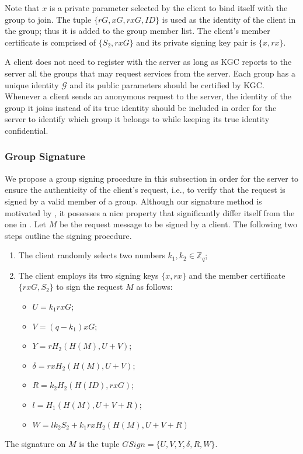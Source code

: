 \documentclass[letterpaper,12pt]{article}
\begin{document}
Note that $x$ is a private parameter selected by the client to bind itself with the group to join.
The tuple $\{rG, xG, rxG, ID\}$ is used as the identity of the client in the group; thus it is added to the group member list. The client's member certificate is comprised of $\{S_2, rxG\}$ and its private signing key pair is $\{x, rx\}$.

A client does not need to register with the server as long as KGC reports to the server all the groups that may request services from the server. Each group has a unique identity $\mathcal{G}$ and its public parameters should be certified by KGC. Whenever a client sends an anonymous request to the server, the identity of the group it joins instead of its true identity should be included in order for the server to identify which group it belongs to while keeping its true identity confidential.

\subsubsection{Group Signature}\label{sec:signprotocol}
We propose a group signing procedure in this subsection in order for the server to ensure the authenticity of the client's request, i.e., to verify that the request is signed by a valid member of a group. Although our signature method is motivated by  \cite{chen2003new}, it possesses a nice property that significantly differ itself from the one in  \cite{chen2003new}. Let $M$ be the request message to be signed by a client. The following two steps outline the signing procedure.

\begin{enumerate}
\item  The client randomly selects two numbers ${k_1, k_2} \in \mathbb{Z}_q $;

\item  The client employs its two signing keys $\{x, rx\}$ and the member certificate $\{rxG,S_2\}$ to sign the request $M$ as follows:
\begin{itemize}
\item $U=k_1rxG$;
\item $V=(q-k_1)xG$;
\item $Y=rH_2(H(M), U+V)$;
\item $\delta=rxH_2(H(M), U+V)$;
\item $R=k_2H_2(H(ID), rxG)$;
\item $l=H_1(H(M), U+V+R)$;
\item $W=lk_2S_2+k_1rxH_2(H(M), U+V+R)$
\end{itemize}
\end{enumerate}
The signature on $M$ is the tuple $ GSign=\{U, V, Y, \delta, R, W\}$.
\end{document}
